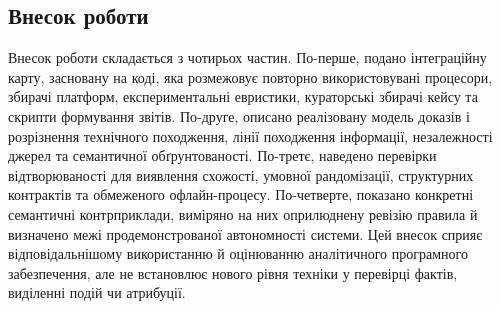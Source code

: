 \subsection{Внесок роботи}
Внесок роботи складається з чотирьох частин. По-перше, подано інтеграційну карту, засновану на коді, яка розмежовує повторно використовувані процесори, збирачі платформ, експериментальні евристики, кураторські збирачі кейсу та скрипти формування звітів. По-друге, описано реалізовану модель доказів і розрізнення технічного походження, лінії походження інформації, незалежності джерел та семантичної обґрунтованості. По-третє, наведено перевірки відтворюваності для виявлення схожості, умовної рандомізації, структурних контрактів та обмеженого офлайн-процесу. По-четверте, показано конкретні семантичні контрприклади, виміряно на них оприлюднену ревізію правила й визначено межі продемонстрованої автономності системи. Цей внесок сприяє відповідальнішому використанню й оцінюванню аналітичного програмного забезпечення, але не встановлює нового рівня техніки у перевірці фактів, виділенні подій чи атрибуції.
